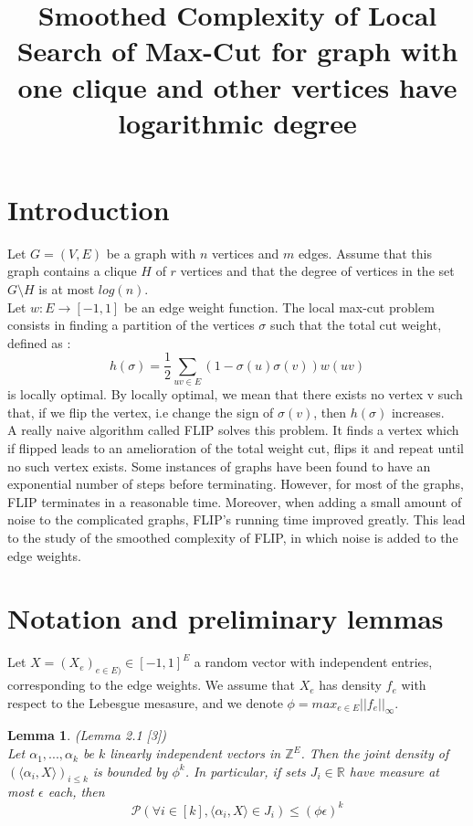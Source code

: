 \documentclass[12pt]{article}
\title{Smoothed Complexity of Local Search of Max-Cut for graph with one clique and other  vertices have logarithmic degree}
\newtheorem{lemma}[theorem]{Lemma}
\begin{document}
\maketitle

\section{Introduction}

Let $G = (V,E)$ be a graph with $n$ vertices and $m$ edges. Assume that this graph contains a clique $H$ of $r$ vertices and that the degree of vertices in the set $G \setminus H$ is at most $log(n)$. \\
Let $w : E \rightarrow [-1, 1]$ be an edge weight function. The local max-cut problem consists in finding a partition of the vertices $\sigma$ such that the total cut weight, defined as :
\begin{equation*}
h(\sigma) = \dfrac{1}{2}\sum_{uv \in E}(1 - \sigma(u)\sigma(v))w(uv)
\end{equation*}
is locally optimal. By locally optimal, we mean that there exists no vertex v such that, if we flip the vertex, i.e change the sign of $\sigma(v)$, then $h(\sigma)$ increases.\\ 

A really naive algorithm called FLIP solves this problem. It finds a vertex which if flipped leads to an amelioration of the total weight cut, flips it and repeat until no such vertex exists. Some instances of graphs have been found to have an exponential number of steps before terminating. However, for most of the graphs, FLIP terminates in a reasonable time. Moreover, when adding a small amount of noise to the complicated graphs, FLIP's running time improved greatly. This lead to the study of the smoothed complexity of FLIP, in which noise is added to the edge weights.

\section{Notation and preliminary lemmas}

Let $X = (X_e)_{e \in E)} \in [-1, 1]^E$ a random vector with independent entries, corresponding to the edge weights. We assume that $X_e$ has density $f_e$ with respect to the Lebesgue mesasure, and we denote $\phi = max_{e \in E}||f_e||_\infty$. 

\begin{lemma} (Lemma 2.1 [3])\\
\label{noise}
Let $\alpha_1, ..., \alpha_k$ be $k$ linearly independent vectors in $\mathbb{Z}^E$. Then the joint density of$ (\langle \alpha_i, X \rangle)_{i \leq k}$ is bounded by $\phi^k$. In particular, if sets $J_i \in \mathbb R$ have measure at most $\epsilon$ each, then 
\begin{equation*}
\mathcal{P} (\forall i \in [k], \langle \alpha_i, X \rangle \in J_i) \leq (\phi \epsilon)^k
\end{equation*}
\end{lemma}
\end{document}

